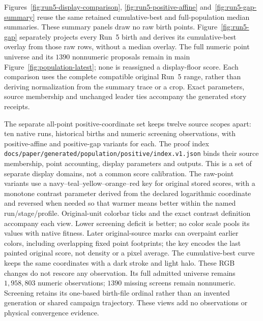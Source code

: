 Figures~\ref{fig:run5-display-comparison}, \ref{fig:run5-positive-affine}
and~\ref{fig:run5-gap-summary} reuse the same retained cumulative-best
and full-population median summaries. These summary panels draw no raw
birth points. Figure~\ref{fig:run5-gap} separately projects every
Run~5 birth and derives its cumulative-best overlay from those raw rows,
without a median overlay. The full numeric point universe and its $1390$
nonnumeric proposals remain in main Figure~\ref{fig:population-latest};
none is reassigned a display-floor score.
Each comparison uses the complete compatible original Run~5 range,
rather than deriving normalization from the summary trace or a crop.
Exact parameters, source membership and unchanged leader ties accompany
the generated story receipts.

The separate all-point positive-coordinate set keeps twelve source scopes
apart: ten native runs, historical births and numeric screening observations,
with positive-affine and positive-gap variants for each. The proof index
\nolinkurl{docs/paper/generated/population/positive/index.v1.json} binds
their source membership, point accounting, display parameters and outputs.
This is a set of separate display domains, not a common score calibration.
The raw-point variants use a navy--teal--yellow--orange--red key for original
stored scores, with a monotone contrast parameter derived from the declared
logarithmic coordinate and reversed when needed so that warmer means better
within the named run/stage/profile. Original-unit colorbar ticks and the exact
contrast definition accompany each view. Lower screening deficit is better;
no color scale pools its values with native fitness. Later original-source
marks can overpaint earlier colors, including overlapping fixed point footprints;
the key encodes the last painted original score, not density or a pixel average.
The cumulative-best curve keeps the same coordinates with a dark stroke and
light halo. These RGB changes do not rescore any observation.
Its full admitted universe remains $1{,}958{,}803$ numeric observations;
$1390$ missing screens remain nonnumeric. Screening retains its one-based
birth-file ordinal rather than an invented generation or shared campaign
trajectory. These views add no observations or physical convergence evidence.

